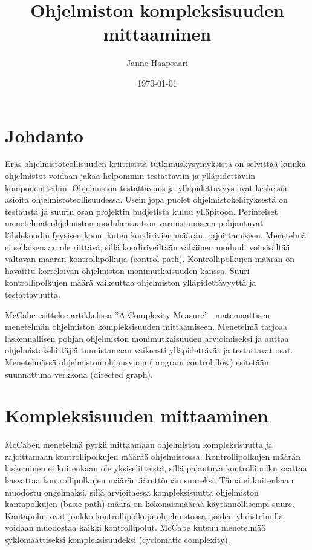\documentclass[finnish]{tktltiki2}
\title{Ohjelmiston kompleksisuuden mittaaminen}
\author{Janne Haapsaari}
\date{\today}
\theoremstyle{definition}
\theoremstyle{remark}
\begin{document}

\frontmatter      %

\maketitle        %

\tableofcontents  %


\mainmatter       %

\section{Johdanto}

Eräs ohjelmistoteollisuuden kriittisistä tutkimuskysymyksistä on selvittää kuinka ohjelmistot voidaan jakaa helpommin testattaviin ja ylläpidettäviin komponentteihin. Ohjelmiston testattavuus ja ylläpidettävyys ovat keskeisiä asioita ohjelmistoteollisuudessa. Usein jopa puolet ohjelmistokehityksestä on testausta ja suurin osan projektin budjetista kuluu ylläpitoon. Perinteiset menetelmät ohjelmiston modularisaation varmistamiseen pohjautuvat lähdekoodin fyysisen koon, kuten koodirivien määrän, rajoittamiseen. Menetelmä ei sellaisenaan ole riittävä, sillä koodiriveiltään vähäinen moduuli voi sisältää valtavan määrän kontrollipolkuja (control path). Kontrollipolkujen määrän on havaittu korreloivan ohjelmiston monimutkaisuuden kanssa. Suuri kontrollipolkujen määrä vaikeuttaa ohjelmiston ylläpidettävyyttä ja testattavuutta.

McCabe esittelee artikkelissa ''A Complexity Measure''~\cite{McGabe} matemaattisen menetelmän ohjelmiston kompleksisuuden mittaamiseen. Menetelmä tarjoaa laskennallisen pohjan ohjelmiston monimutkaisuuden arvioimiseksi ja auttaa ohjelmistokehittäjiä tunnistamaan vaikeasti ylläpidettävät ja testattavat osat. Menetelmässä ohjelmiston ohjausvuon (program control flow) esitetään suunnattuna verkkona (directed graph).

\section{Kompleksisuuden mittaaminen}

McCaben menetelmä pyrkii mittaamaan ohjelmiston kompleksisuutta ja rajoittamaan kontrollipolkujen määrää ohjelmistossa. Kontrollipolkujen määrän laskeminen ei kuitenkaan ole yksiselitteistä, sillä palautuva kontrollipolku saattaa kasvattaa kontrollipolkujen määrän äärettömän suureksi. Tämä ei kuitenkaan muodostu ongelmaksi, sillä arvioitaessa kompleksisuutta ohjelmiston kantapolkujen (basic path) määrä on kokonaismäärää käytännöllisempi suure. Kantapolut ovat joukko kontrollipolkuja ohjelmistossa, joiden yhdistelmillä voidaan muodostaa kaikki kontrollipolut. McCabe kutsuu menetelmää syklomaattiseksi kompleksisuudeksi (cyclomatic complexity).
\end{document}

